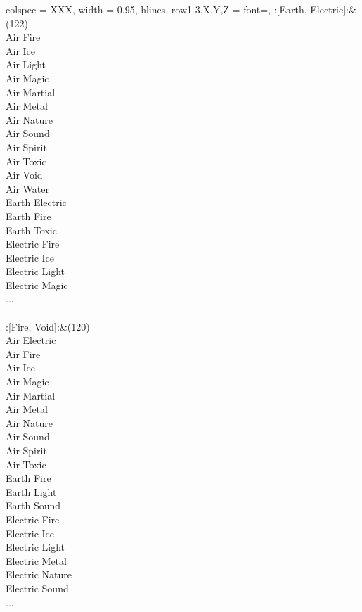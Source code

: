 \begin{longtblr}[
	caption = {2v2 Defending Weak},
	label = {2v2-Defending-Weak},
]{
	colspec = {XXX}, width = 0.95\linewidth,
	hlines,
	row{1-3,X,Y,Z} = {font=\bfseries},
}
	:[Earth, Electric]:&{(122)\\
	Air Fire \\
	Air Ice \\
	Air Light \\
	Air Magic \\
	Air Martial \\
	Air Metal \\
	Air Nature \\
	Air Sound \\
	Air Spirit \\
	Air Toxic \\
	Air Void \\
	Air Water \\
	Earth Electric \\
	Earth Fire \\
	Earth Toxic \\
	Electric Fire \\
	Electric Ice \\
	Electric Light \\
	Electric Magic \\
	...\\
	}\\

	:[Fire, Void]:&{(120)\\
	Air Electric \\
	Air Fire \\
	Air Ice \\
	Air Magic \\
	Air Martial \\
	Air Metal \\
	Air Nature \\
	Air Sound \\
	Air Spirit \\
	Air Toxic \\
	Earth Fire \\
	Earth Light \\
	Earth Sound \\
	Electric Fire \\
	Electric Ice \\
	Electric Light \\
	Electric Metal \\
	Electric Nature \\
	Electric Sound \\
	...\\
	}\\


\end{longtblr}
